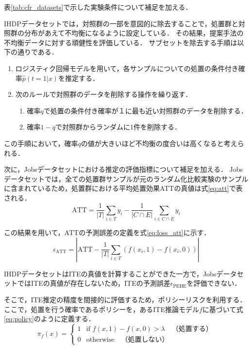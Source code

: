 \documentclass[dvipdfmx]{jreport}
\begin{document}
表\ref{tab:cfr_datasets}で示した実験条件について補足を加える．

IHDPデータセットでは，対照群の一部を意図的に除去することで，処置群と対照群の分布があえて不均衡になるように設定している．
その結果，提案手法の不均衡データに対する頑健性を評価している．
サブセットを除去する手順は以下の通りである．
\begin{tcolorbox}[title=\textbf{IHDPデータセットにおけるサブセット除去の手順}]
    \begin{enumerate}
        \item ロジスティク回帰モデルを用いて，各サンプルについての処置の条件付き確率$\hat{p}(t=1|x)$を推定する．
        \item 次のルールで対照群のデータを削除する操作を繰り返す．
        \begin{enumerate}
            \item 確率$q$で処置の条件付き確率が１に最も近い対照群のデータを削除する．
            \item 確率$1-q$で対照群からランダムに1件を削除する．
        \end{enumerate}
    \end{enumerate}
\end{tcolorbox}
この手順において，確率$q$の値が大きいほど不均衡の度合いは高くなると考えられる．

次に，Jobsデータセットにおける推定の評価指標について補足を加える．
Jobsデータセットでは，全ての処置群サンプルが元のランダム化比較実験のサンプルに含まれているため，処置群における平均処置効果ATTの真値は式\eqref{eq:att}で表される．
\begin{equation}
    \mathrm{ATT} = \frac{1}{|T|} \sum_{i \in T} y_i - \frac{1}{|C \cap E|} \sum_{i \in C \cap E} y_i \label{eq:att}
\end{equation}

この結果を用いて，ATTの予測誤差の定義を式\eqref{eq:loss_att}に示す．
\begin{equation}
    \epsilon_{\text{ATT}} = \left| \mathrm{ATT} - \frac{1}{|T|} \sum_{i \in T} \left( f(x_i, 1) - f(x_i, 0) \right) \right| \label{eq:loss_att}
\end{equation}

IHDPデータセットはITEの真値を計算することができた一方で，JobsデータセットではITEの真値が存在しないため，ITEの予測誤差$\epsilon_{\mathrm{PEHE}}$を評価できない．

そこで，ITE推定の精度を間接的に評価するため，ポリシーリスクを利用する．
ここで，処置を行う確率であるポリシーを，あるITE推論モデル$f$に基づいて式\eqref{eq:policy}のように定義する．
\begin{equation}
    \pi_f(x) =
    \begin{cases}
    1 & \text{if } f(x,1) - f(x,0) > \lambda \quad \text{（処置する）} \\
    0 & \text{otherwise} \quad \text{（処置しない）} \label{eq:policy}
    \end{cases}
\end{equation}
\end{document}
